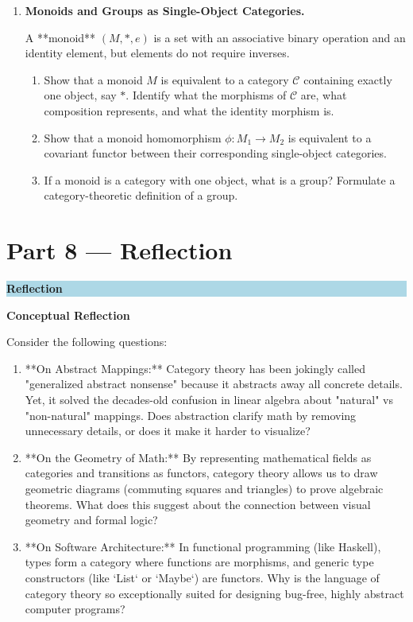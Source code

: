 \documentclass[12pt, a4paper]{article}
\newenvironment{reflectionbox}
  {\par\medskip\fillcolorbox{LightBlue}{ReflectColor}{Reflection}}
  {\par\medskip}
\newcommand{\fillcolorbox}[3]{%
  \noindent
  \filldrawbox{#1}{#2}{\textbf{\sffamily\color{white}#3}}\par\nobreak\vspace{4pt}
}
\newcommand{\filldrawbox}[3]{%
  \colorbox{#1}{\parbox{\dimexpr\linewidth-2\fboxsep\relax}{%
    \vspace{4pt}\noindent\hspace{4pt}#3\vspace{4pt}%
  }}%
}
\begin{document}
\begin{enumerate}[label=\textbf{D\arabic*.}]
  \item \textbf{Monoids and Groups as Single-Object Categories.}
  
        A **monoid** $(M, *, e)$ is a set with an associative binary operation and an identity element, but elements do not require inverses.
        \begin{enumerate}[label=(\alph*)]
          \item Show that a monoid $M$ is equivalent to a category $\mathcal{C}$ containing exactly one object, say $*$.
                Identify what the morphisms of $\mathcal{C}$ are, what composition represents, and what the identity morphism is.
          \item Show that a monoid homomorphism $\phi: M_1 \to M_2$ is equivalent to a covariant functor between their corresponding single-object categories.
          \item If a monoid is a category with one object, what is a group? Formulate a category-theoretic definition of a group.
        \end{enumerate}
\end{enumerate}

\newpage

\section{Part 8 --- Reflection}

\begin{reflectionbox}
\textbf{Conceptual Reflection}

Consider the following questions:
\begin{enumerate}
  \item **On Abstract Mappings:** Category theory has been jokingly called "generalized abstract nonsense" because it abstracts away all concrete details. Yet, it solved the decades-old confusion in linear algebra about "natural" vs "non-natural" mappings. Does abstraction clarify math by removing unnecessary details, or does it make it harder to visualize?
  \item **On the Geometry of Math:** By representing mathematical fields as categories and transitions as functors, category theory allows us to draw geometric diagrams (commuting squares and triangles) to prove algebraic theorems. What does this suggest about the connection between visual geometry and formal logic?
  \item **On Software Architecture:** In functional programming (like Haskell), types form a category where functions are morphisms, and generic type constructors (like `List` or `Maybe`) are functors. Why is the language of category theory so exceptionally suited for designing bug-free, highly abstract computer programs?
\end{enumerate}
\end{reflectionbox}
\end{document}
